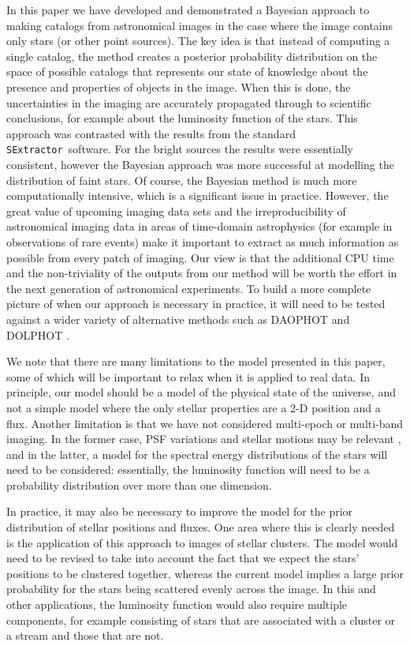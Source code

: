 \documentclass[12pt, preprint]{aastex}
\newcommand{\sex}{{\tt SExtractor}}
\begin{document}
In this paper we have developed and demonstrated a Bayesian approach to
making catalogs from astronomical images in the case where the image contains
only stars (or other point sources). The key idea is that instead of computing
a single catalog, the method creates a posterior probability distribution on
the space of possible catalogs that represents our state of knowledge about
the presence and properties of objects in the image. When this is done, the
uncertainties in the imaging are accurately propagated through to scientific
conclusions, for example about the luminosity function of the stars.
This approach was contrasted with the results from the standard \sex~software.
For the bright sources the results were essentially consistent, however the
Bayesian approach was more successful at modelling the distribution of faint
stars. Of course, the Bayesian method is much more computationally intensive,
which is a significant issue in practice.
However, the great value of upcoming imaging data sets and the irreproducibility of astronomical imaging data in areas of time-domain astrophysics (for example in observations of rare events) make it important to extract as much information as possible from every patch of imaging.  Our view is that the additional CPU time and the non-triviality of the outputs from our method will be worth the effort in the next generation of astronomical experiments.
To build a more complete picture of
when our approach is necessary in practice, it will need to be tested against
a wider variety of alternative methods  such as DAOPHOT \citep{1987PASP...99..191S}
and DOLPHOT \citep{dolphot}.

We note that there are many limitations to the model presented in this paper,
some of which will be important to relax when it is applied to real data.
In principle, our model should be a model of the physical state of the universe,
and not a simple model where the only stellar properties are a 2-D position and
a flux. Another limitation is that we have not considered multi-epoch or multi-band
imaging. In the former case, PSF variations and stellar motions may be relevant
\citep{lang}, and in the latter, a model for the spectral energy distributions
of the stars will need to be considered: essentially, the luminosity function
will need to be a probability distribution over more than one dimension.

In practice, it may also be necessary to improve the model for the prior
distribution
of stellar positions and fluxes. One area where this is clearly needed is the
application of this approach to images of stellar clusters. The model would need
to be revised to take into account the fact that we expect the stars' positions
to be clustered together, whereas the current model implies a large prior
probability for the stars being scattered evenly across the image. In this and
other applications, the luminosity function would also require multiple
components, for example consisting of stars that are associated with a cluster
or a stream and those that are not.
\end{document}
